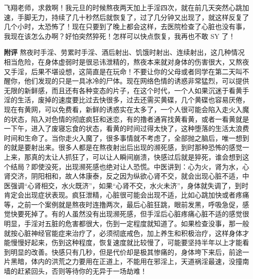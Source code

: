 \begin{case}
    飞翔老师，求救啊！我元旦的时候熬夜两天加上手淫四次，就在前几天突然心跳加速，手脚无力，持续了几十秒然后就恢复了，过了几分钟又出现了，就这样反复了几个小时，太恐怖了！现在只要到了晚上都会这样，去医院检查了心脏也没有事，我现在该怎么办啊？好怕突然猝死！怎样可以快点恢复，我再也不敢 SY 了！

    \textbf{附评} 熬夜时手淫、劳累时手淫、酒后射出、饥饿时射出、连续射出，这几种情况相当危险，在身体虚弱时是很忌讳泄精的，熬夜本来就对身体的伤害很大，又熬夜又手淫，后果不堪设想，这简直是在玩命！不要让你的父母或者同学在第二天叫不醒你，他们发现的只是一具冰冷的尸体。现在网络色情的诱惑非常猛烈，可以提供无限的新鲜感，而且还有各种变态的片子，在这个时代，一个人如果沉迷于看黄手淫的生活，废掉的速度要比过去快很多，过去还需买黄碟，几个黄碟也容易厌倦，现在有黄网，可以免费看，新鲜的诱惑实在太多了，一个人很可能会陷入走火入魔的状态，陷入对色情的彻底疯狂和迷恋，有的撸者通宵找黄看黄，或者一看黄就是一下午，进入了废寝忘食的状态，看黄的时间过得太快了，这种堕落的生活太浪费时间和生命了。当你走火入魔了，很多事情就不考虑了，全部抛之脑后，唯一想到的就是要射出来。很多人都是在熬夜射出后出现的濒死感，到时那种恐怖的感觉一上来，那真的太让人抓狂了，可以让人瞬间崩溃，快感过后就是猝死，谁会想到这个结局？即使没死，出现濒死感也绝对让人恐慌。中医讲到：心为火，肾为水，心肾交济，阴阳相和，故人体康泰，反之因为纵欲心肾不交，就会出现心脏不适，中医强调“心肾相交，水火既济”，如果“心肾不交，水火未济”，身体就失调了，到时肯定会出现症状表现。疯狂泄精，心脏很可能会出现不适，比如心跳加快或者疼痛等，之前一个案例就是熬夜时连撸两次，最后心脏狂跳，眼前发黑，呼吸急促，感觉快要死掉了。有的人虽然没有出现濒死感，但手淫后心脏疼痛心脏不适的感觉很明显，手淫对五脏的危害都很大，伤到一定程度就知道了。如果检查没事，那一般就按心脏神经官能症来治疗了，必须彻底戒色，加上养生和积极治疗，这样身体才能慢慢好起来，伤到这种程度，恢复速度就比较慢了，可能要坚持半年以上才能看到明显的改善。快感只有几秒，但是代价却是极其惨痛的，身体垮下来后，前途一片黑暗，体内的洪荒之力要用在正道上，不能用在邪淫上，天道祸淫最速，没撞南墙的赶紧回头，否则等待你的无异于一场劫难！
\end{case}

